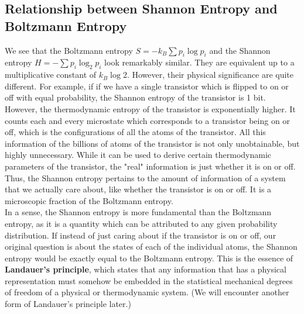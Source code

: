 \documentclass[letterpaper,10pt,english]{article}
\begin{document}
\subsection{Relationship between Shannon Entropy and Boltzmann Entropy}
We see that the Boltzmann entropy $S=-k_B \sum p_i \log p_i$ and the Shannon entropy $H=-\sum p_i \log_2 p_i$ look remarkably similar. They are equivalent up to a multiplicative constant of $k_B \log 2$. However, their physical significance are quite different. For example, if if we have a single transistor which is flipped to on or off with equal probability, the Shannon entropy of the transistor is 1 bit. However, the thermodynamic entropy of the transistor is exponentially higher. It counts each and every microstate which corresponds to a transistor being on or off, which is the configurations of all the atoms of the transistor. All this information of the billions of atoms of the transistor is not only unobtainable, but highly unnecessary. While it can be used to derive certain thermodynamic parameters of the transistor, the "real" information is just whether it is on or off. Thus, the Shannon entropy pertains to the amount of information of a system that we actually care about, like whether the transistor is on or off. It is a microscopic fraction of the Boltzmann entropy. \\
In a sense, the Shannon entropy is more fundamental than the Boltzmann entropy, as it is a quantity which can be attributed to any given probability distribution. If instead of just caring about if the transistor is on or off, our original question is about the states of each of the individual atoms, the Shannon entropy would be exactly equal to the Boltzmann entropy. This is the essence of \textbf{Landauer's principle}, which states that any information that has a physical representation must somehow be embedded in the statistical mechanical degrees of freedom of a physical or thermodynamic system. (We will encounter another form of Landauer's principle later.)
\end{document}
